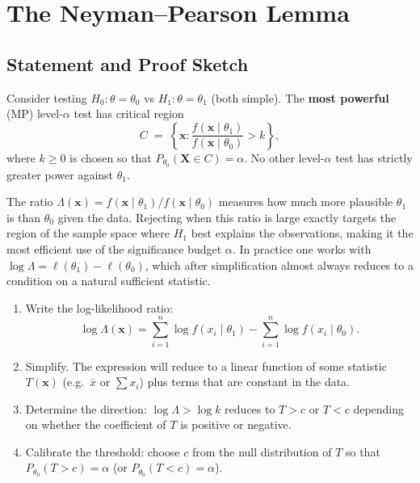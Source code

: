 \documentclass[11pt, a4paper]{article}
\begin{document}
\newpage
\section{The Neyman--Pearson Lemma}

\subsection*{Statement and Proof Sketch}

\begin{thmbox}
Consider testing $H_0\colon \theta = \theta_0$ vs $H_1\colon \theta = \theta_1$ (both simple). The \textbf{most powerful} (MP) level-$\alpha$ test has critical region
\[
  C \;=\; \left\{\mathbf{x} : \frac{f(\mathbf{x} \mid \theta_1)}{f(\mathbf{x} \mid \theta_0)} > k\right\},
\]
where $k \geq 0$ is chosen so that $P_{\theta_0}(\mathbf{X} \in C) = \alpha$. No other level-$\alpha$ test has strictly greater power against $\theta_1$.
\end{thmbox}

\begin{warnbox}
The ratio $\Lambda(\mathbf{x}) = f(\mathbf{x} \mid \theta_1)/f(\mathbf{x} \mid \theta_0)$ measures how much more plausible $\theta_1$ is than $\theta_0$ given the data. Rejecting when this ratio is large exactly targets the region of the sample space where $H_1$ best explains the observations, making it the most efficient use of the significance budget $\alpha$. In practice one works with $\log \Lambda = \ell(\theta_1) - \ell(\theta_0)$, which after simplification almost always reduces to a condition on a natural sufficient statistic.
\end{warnbox}

\begin{methodbox}
\begin{enumerate}
  \item Write the log-likelihood ratio:
        \[
          \log \Lambda(\mathbf{x}) = \sum_{i=1}^n \log f(x_i \mid \theta_1)
                                    - \sum_{i=1}^n \log f(x_i \mid \theta_0).
        \]
  \item Simplify. The expression will reduce to a linear function of some statistic $T(\mathbf{x})$ (e.g.\ $\bar{x}$ or $\sum x_i$) plus terms that are constant in the data.
  \item Determine the direction: $\log \Lambda > \log k$ reduces to $T > c$ or $T < c$ depending on whether the coefficient of $T$ is positive or negative.
  \item Calibrate the threshold: choose $c$ from the null distribution of $T$ so that $P_{\theta_0}(T > c) = \alpha$ (or $P_{\theta_0}(T < c) = \alpha$).
\end{enumerate}
\end{methodbox}
\end{document}
